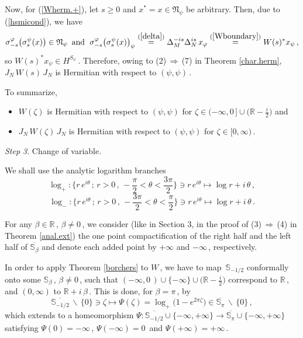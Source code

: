 \documentclass[reqno]{amsart}
\theoremstyle{definition}
\theoremstyle{remark}
\numberwithin{equation}{section}
\theoremstyle{plain}
\begin{document}
Now, for (\ref{Wherm.+}), let $s\geq 0$ and $x^*=x\in\mathfrak N_\psi$
be arbitrary. Then, due to (\ref{hsmicond}), we have
\begin{equation*}
\sigma^\varphi_{-s}\big(\sigma^\psi_s(x)\big)\in \mathfrak N_\psi\,
\text{ and }\;\sigma^\varphi_{-s}\big(\sigma^\psi_s(x)\big)_\psi
\overset{(\ref{delta})}{=} \Delta_M^{-is}\Delta_N^{is}\, x_\varphi
\overset{(\ref{Wboundary})}{=} W(s)^* x_\psi\, ,
\end{equation*}
so $W(s)^* x_\psi\in H^{S_\psi}\,$. Therefore, owing to
(2)$\,\Rightarrow\,$(7) in Theorem \ref{char.herm},
$J_N\, W(s)\, J_N$ is Hermitian with respect to $(\psi ,\psi )\,$.

To summarize,
\begin{itemize}
\item[--] $W(\zeta )$ is Hermitian with respect to $(\psi ,\psi )$
for $\displaystyle \zeta\in (-\infty ,0\, ]\cup\Big(\mathbb R -
\frac i2\Big)$ and
\item[--] $J_N\, W(\zeta )\, J_N$ is Hermitian with respect to
$(\psi ,\psi )$ for $\zeta\in [0,\infty )\,$.
\end{itemize}
\bigskip

{\it Step 3}. {\sc Change of variable.}
\medskip

We shall use the analytic logarithm branches
\begin{equation*}
\log_+ : \Big\{ r\, e^{i \theta}\, ;\, r>0\, ,\, -\frac{\pi}2
<\theta <\frac{3 \pi}2 \Big\}\ni r\, e^{i \theta}\longmapsto
\log r +i\,\theta\, ,
\end{equation*}
\begin{equation*}
\log_{-} : \Big\{ r\, e^{i \theta}\, ;\, r>0\, ,\, -\frac{3 \pi}2
<\theta <\frac{\pi}2 \Big\}\ni r\, e^{i \theta}\longmapsto
\log r +i\,\theta\, .
\end{equation*}

For any $\beta\in\mathbb R\,$, $\beta\neq 0\,$, we consider (like
in Section 3, in the proof of (3)$\,\Rightarrow\,$(4) in Theorem
\ref{anal.ext}) the one point compactification of the right half
and the left half of $\overline{\mathbb S_\beta}$ and denote each
added point by $+\infty$ and $-\infty\,$, respectively.

In order to apply Theorem \ref{borchers} to $W\,$, we have
to map $\,\mathbb S_{-1/2}$ conformally onto some
$\mathbb S_\beta\,$, $\beta\neq 0\,$, such that
$\displaystyle (-\infty ,0\, )\cup\{ -\infty\}\cup\Big(\mathbb R
-\frac i2\Big)$ correspond to $\mathbb R\,$, and $(0,\infty )$ to
$\mathbb R +i\,\beta\,$. This is done, for $\beta =\pi\,$, by
\begin{equation*}
\overline{\mathbb S_{-1/2}}\,\backslash\,\{ 0\}\ni\zeta
\longmapsto\Psi (\zeta )=\log_+\big( 1-e^{2 \pi \zeta}\big)\in
\overline{\mathbb S_\pi}\,\backslash\,\{ 0\}\, ,
\end{equation*}
which extends to a homeomorphism $\Psi : \overline{\mathbb S_{-1/2}}
\cup\{-\infty ,+\infty\}\longrightarrow\overline{\mathbb S_\pi}
\cup\{-\infty ,+\infty\}$ satisfying $\Psi (0)=-\infty\,$,
$\Psi (-\infty )=0\,$ and $\Psi (+\infty )=+\infty\,$.
\end{document}
